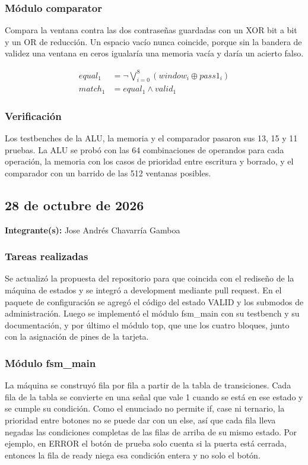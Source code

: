 \documentclass[11pt,letterpaper]{article}
\newcommand{\entrada}[2]{%
  \subsection*{#1}%
  \addcontentsline{toc}{subsection}{#1}%
  \noindent\textbf{Integrante(s):} #2\par\medskip
}
\begin{document}
\subsubsection*{Módulo comparator}

Compara la ventana contra las dos contraseñas guardadas con un XOR bit a bit y un OR de reducción. Un espacio vacío nunca coincide, porque sin la bandera de validez una ventana en ceros igualaría una memoria vacía y daría un acierto falso.

\begin{align*}
equal_1 &= \lnot \textstyle\bigvee_{i=0}^{8} (window_i \oplus pass1_i) \\
match_1 &= equal_1 \land valid_1
\end{align*}

\subsubsection*{Verificación}

Los testbenches de la ALU, la memoria y el comparador pasaron sus 13, 15 y 11 pruebas. La ALU se probó con las 64 combinaciones de operandos para cada operación, la memoria con los casos de prioridad entre escritura y borrado, y el comparador con un barrido de las 512 ventanas posibles.

\entrada{28 de octubre de 2026}{Jose Andrés Chavarría Gamboa}

\subsubsection*{Tareas realizadas}

Se actualizó la propuesta del repositorio para que coincida con el rediseño de la máquina de estados y se integró a development mediante pull request. En el paquete de configuración se agregó el código del estado VALID y los submodos de administración. Luego se implementó el módulo fsm\_main con su testbench y su documentación, y por último el módulo top, que une los cuatro bloques, junto con la asignación de pines de la tarjeta.

\subsubsection*{Módulo fsm\_main}

La máquina se construyó fila por fila a partir de la tabla de transiciones. Cada fila de la tabla se convierte en una señal que vale 1 cuando se está en ese estado y se cumple su condición. Como el enunciado no permite if, case ni ternario, la prioridad entre botones no se puede dar con un else, así que cada fila lleva negadas las condiciones completas de las filas de arriba de su mismo estado. Por ejemplo, en ERROR el botón de prueba solo cuenta si la puerta está cerrada, entonces la fila de ready niega esa condición entera y no solo el botón.
\end{document}
